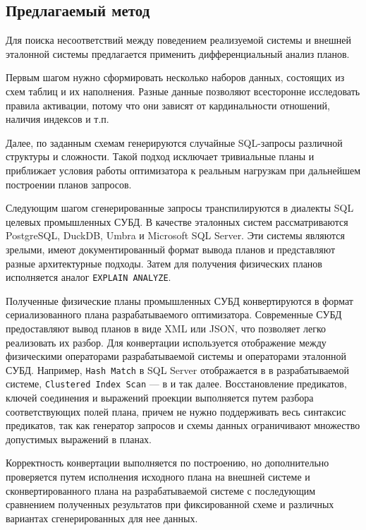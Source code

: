 \documentclass[fontsize=14pt, russian]{scrartcl}
\begin{document}
\subsection{Предлагаемый метод}

Для поиска несоответствий между поведением реализуемой системы и внешней
эталонной системы предлагается применить дифференциальный анализ планов.

Первым шагом нужно сформировать несколько наборов данных, состоящих из схем
таблиц и их наполнения. Разные данные позволяют всесторонне исследовать правила
активации, потому что они зависят от кардинальности отношений, наличия индексов
и т.п.

Далее, по заданным схемам генерируются случайные SQL-запросы различной структуры
и сложности. Такой подход исключает тривиальные планы и приближает условия
работы оптимизатора к реальным нагрузкам при дальнейшем построении планов
запросов.

Следующим шагом сгенерированные запросы транспилируются в диалекты SQL целевых
промышленных СУБД. В качестве эталонных систем рассматриваются PostgreSQL,
DuckDB, Umbra и Microsoft SQL Server. Эти системы являются зрелыми, имеют
документированный формат вывода планов и представляют разные архитектурные
подходы. Затем для получения физических планов исполняется аналог
\texttt{EXPLAIN ANALYZE}.

Полученные физические планы промышленных СУБД конвертируются в формат
сериализованного плана разрабатываемого оптимизатора. Современные СУБД
предоставляют вывод планов в виде XML или JSON, что позволяет легко реализовать
их разбор. Для конвертации используется отображение между физическими
операторами разрабатываемой системы и операторами эталонной СУБД. Например,
\texttt{Hash Match} в SQL Server отображается в \HashJoin{} в разрабатываемой
системе, \texttt{Clustered Index Scan} --- в \IndexScan{} и так далее.
Восстановление предикатов, ключей соединения и выражений проекции выполняется
путем разбора соответствующих полей плана, причем не нужно поддерживать весь
синтаксис предикатов, так как генератор запросов и схемы данных ограничивают
множество допустимых выражений в планах.

Корректность конвертации выполняется по построению, но дополнительно проверяется
путем исполнения исходного плана на внешней системе и сконвертированного плана
на разрабатываемой системе с последующим сравнением полученных результатов при
фиксированной схеме и различных вариантах сгенерированных для нее данных.
\end{document}
